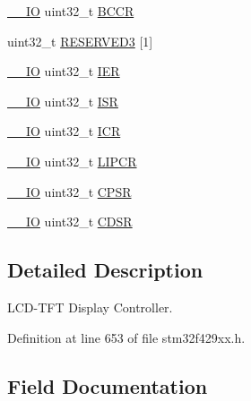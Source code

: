 \begin{DoxyCompactItemize}
\item 
\hyperlink{core__sc300_8h_aec43007d9998a0a0e01faede4133d6be}{\+\_\+\+\_\+\+IO} uint32\+\_\+t \hyperlink{struct_l_t_d_c___type_def_a7a7c554d0c2d78d8b044a699602e37e1}{B\+C\+CR}
\item 
uint32\+\_\+t \hyperlink{struct_l_t_d_c___type_def_a41add28c14461ad6ca03e7311db7640a}{R\+E\+S\+E\+R\+V\+E\+D3} \mbox{[}1\mbox{]}
\item 
\hyperlink{core__sc300_8h_aec43007d9998a0a0e01faede4133d6be}{\+\_\+\+\_\+\+IO} uint32\+\_\+t \hyperlink{struct_l_t_d_c___type_def_a6566f8cfbd1d8aa7e8db046aa35e77db}{I\+ER}
\item 
\hyperlink{core__sc300_8h_aec43007d9998a0a0e01faede4133d6be}{\+\_\+\+\_\+\+IO} uint32\+\_\+t \hyperlink{struct_l_t_d_c___type_def_ab3c49a96815fcbee63d95e1e74f20e75}{I\+SR}
\item 
\hyperlink{core__sc300_8h_aec43007d9998a0a0e01faede4133d6be}{\+\_\+\+\_\+\+IO} uint32\+\_\+t \hyperlink{struct_l_t_d_c___type_def_a0a8c8230846fd8ff154b9fde8dfa0399}{I\+CR}
\item 
\hyperlink{core__sc300_8h_aec43007d9998a0a0e01faede4133d6be}{\+\_\+\+\_\+\+IO} uint32\+\_\+t \hyperlink{struct_l_t_d_c___type_def_a7d311d182e9cb4a5acd25f6bb3e1422d}{L\+I\+P\+CR}
\item 
\hyperlink{core__sc300_8h_aec43007d9998a0a0e01faede4133d6be}{\+\_\+\+\_\+\+IO} uint32\+\_\+t \hyperlink{struct_l_t_d_c___type_def_a140588a82bafbf0bf0c983111aadb351}{C\+P\+SR}
\item 
\hyperlink{core__sc300_8h_aec43007d9998a0a0e01faede4133d6be}{\+\_\+\+\_\+\+IO} uint32\+\_\+t \hyperlink{struct_l_t_d_c___type_def_a5e235993884b3f8d42db5f51d9bd1942}{C\+D\+SR}
\end{DoxyCompactItemize}


\subsection{Detailed Description}
L\+C\+D-\/\+T\+FT Display Controller. 

Definition at line 653 of file stm32f429xx.\+h.



\subsection{Field Documentation}
